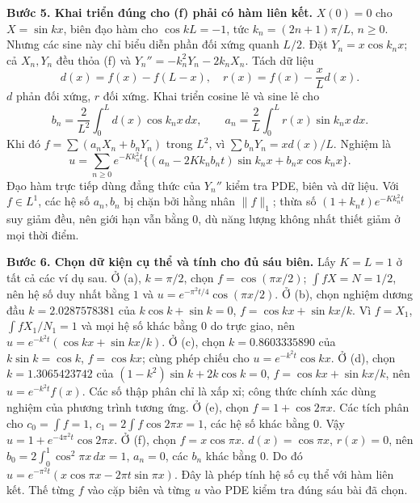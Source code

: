 \textbf{Bước 5. Khai triển đúng cho (f) phải có hàm liên kết.}
$X(0)=0$ cho $X=\sin kx$, biên đạo hàm cho $\cos kL=-1$, tức $k_n=(2n+1)\pi/L$, $n\ge0$. Nhưng các sine này chỉ biểu diễn phần đối xứng quanh $L/2$. Đặt $Y_n=x\cos k_nx$; cả $X_n,Y_n$ đều thỏa (f) và $Y_n''=-k_n^2Y_n-2k_nX_n$. Tách dữ liệu
\[d(x)=f(x)-f(L-x),\quad r(x)=f(x)-\frac xL d(x).\]
$d$ phản đối xứng, $r$ đối xứng. Khai triển cosine lẻ và sine lẻ cho
\[b_n=\frac2{L^2}\int_0^Ld(x)\cos k_nx\,dx,\qquad
a_n=\frac2L\int_0^Lr(x)\sin k_nx\,dx.\]
Khi đó $f=\sum(a_nX_n+b_nY_n)$ trong $L^2$, vì $\sum b_nY_n=xd(x)/L$. Nghiệm là
\[u=\sum_{n\ge0}e^{-Kk_n^2t}
\{(a_n-2Kk_nb_nt)\sin k_nx+b_nx\cos k_nx\}.\]
Đạo hàm trực tiếp dùng đẳng thức của $Y_n''$ kiểm tra PDE, biên và dữ liệu. Với $f\in L^1$, các hệ số $a_n,b_n$ bị chặn bởi hằng nhân $\|f\|_1$; thừa số $(1+k_nt)e^{-Kk_n^2t}$ suy giảm đều, nên giới hạn vẫn bằng $0$, dù năng lượng không nhất thiết giảm ở mọi thời điểm.

\textbf{Bước 6. Chọn dữ kiện cụ thể và tính cho đủ sáu biên.}
Lấy $K=L=1$ ở tất cả các ví dụ sau. Ở (a), $k=\pi/2$, chọn $f=\cos(\pi x/2)$; $\int fX=N=1/2$, nên hệ số duy nhất bằng $1$ và $u=e^{-\pi^2t/4}\cos(\pi x/2)$.
Ở (b), chọn nghiệm dương đầu $k=2.0287578381$ của $k\cos k+\sin k=0$, $f=\cos kx+\sin kx/k$. Vì $f=X_1$, $\int fX_1/N_1=1$ và mọi hệ số khác bằng $0$ do trực giao, nên $u=e^{-k^2t}(\cos kx+\sin kx/k)$. Ở (c), chọn $k=0.8603335890$ của $k\sin k=\cos k$, $f=\cos kx$; cùng phép chiếu cho $u=e^{-k^2t}\cos kx$. Ở (d), chọn $k=1.3065423742$ của $(1-k^2)\sin k+2k\cos k=0$, $f=\cos kx+\sin kx/k$, nên $u=e^{-k^2t}f(x)$. Các số thập phân chỉ là xấp xỉ; công thức chính xác dùng nghiệm của phương trình tương ứng.
Ở (e), chọn $f=1+\cos2\pi x$. Các tích phân cho $c_0=\int f=1$, $c_1=2\int f\cos2\pi x=1$, các hệ số khác bằng $0$. Vậy $u=1+e^{-4\pi^2t}\cos2\pi x$.
Ở (f), chọn $f=x\cos\pi x$. $d(x)=\cos\pi x$, $r(x)=0$, nên $b_0=2\int_0^1\cos^2\pi x\,dx=1$, $a_n=0$, các $b_n$ khác bằng $0$. Do đó $u=e^{-\pi^2t}(x\cos\pi x-2\pi t\sin\pi x)$. Đây là phép tính hệ số cụ thể với hàm liên kết. Thế từng $f$ vào cặp biên và từng $u$ vào PDE kiểm tra đúng sáu bài đã chọn.
